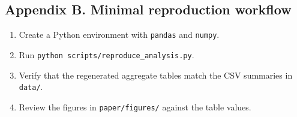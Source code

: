 \documentclass[
]{article}
\providecommand{\tightlist}{%
  \setlength{\itemsep}{0pt}\setlength{\parskip}{0pt}}
\begin{document}
\subsection{Appendix B. Minimal reproduction
workflow}\label{appendix-b.-minimal-reproduction-workflow}

\begin{enumerate}
\def\labelenumi{\arabic{enumi}.}
\tightlist
\item
  Create a Python environment with \texttt{pandas} and \texttt{numpy}.
\item
  Run \texttt{python\ scripts/reproduce\_analysis.py}.
\item
  Verify that the regenerated aggregate tables match the CSV summaries
  in \texttt{data/}.
\item
  Review the figures in \texttt{paper/figures/} against the table
  values.
\end{enumerate}
\end{document}
